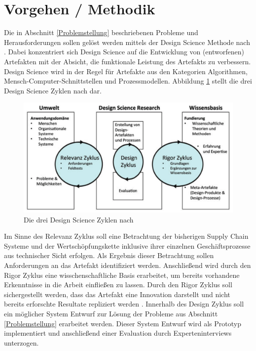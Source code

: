 \section{Vorgehen / Methodik}

Die in Abschnitt \ref{Problemstellung} beschriebenen Probleme und Herausforderungen sollen gelöst werden mittels der Design Science Methode nach \citet{Hevner2004, Hevner2007}. Dabei konzentriert sich Design Science auf die Entwicklung von (entworfenen) Artefakten mit der Absicht, die funktionale Leistung des Artefakts zu verbessern. Design Science wird in der Regel für Artefakte aus den Kategorien Algorithmen, Mensch-Computer-Schnittstellen und Prozessmodellen.\citep{Peffers2012, Kuechler2008} Abbildung \ref{fig:three-cycles-design-science} stellt die drei Design Science Zyklen nach \citet{Hevner2010} dar.

\begin{figure}[h!]
	\centering
	\includegraphics[width=0.70\linewidth]{pictures/three-cycles-design-science}
	\caption[Die drei Design Science Zyklen nach Hevner]{Die drei Design Science Zyklen nach \citet{Hevner2010}}
	\label{fig:three-cycles-design-science}
\end{figure}

Im Sinne des Relevanz Zyklus \citep[siehe auch][]{Simon1996} soll eine Betrachtung der bisherigen Supply Chain Systeme und der Wertschöpfungskette inklusive ihrer einzelnen Geschäftsprozesse aus technischer Sicht erfolgen. Als Ergebnis dieser Betrachtung sollen Anforderungen an das Artefakt identifiziert werden. Anschließend wird durch den Rigor Zyklus eine wisschenschaftliche Basis erarbeitet, um bereits vorhandene Erkenntnisse in die Arbeit einfließen zu lassen. Durch den Rigor Zyklus soll sichergestellt werden, dass das Artefakt eine Innovation darstellt und nicht bereits erforschte Resultate repliziert werden \citep{Hevner2010}. Innerhalb des Design Zyklus soll ein möglicher System Entwurf zur Lösung der Probleme aus Abschnitt \ref{Problemstellung} erarbeitet werden. Dieser System Entwurf wird als Prototyp implementiert und anschließend einer Evaluation durch Experteninterviews \citep[siehe auch][]{Wilde2007} unterzogen.

\newpage
